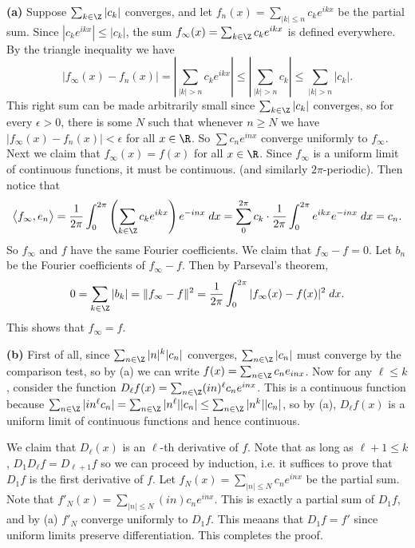 \documentclass[11pt,letterpaper]{article}
\begin{document}
\begin{solution}
    \textbf{(a)} Suppose $\sum_{k\in \Z}|c_k|$ converges, and let $f_n(x)=\sum_{|k|\leq n}c_ke^{ikx}$ be the partial sum. Since $|c_ke^{ikx}|\leq |c_k|$, the sum $f_\infty(x)=\sum_{k\in \Z}c_ke^{ikx}$ is defined everywhere. By the triangle inequality we have
    \[
        |f_\infty(x)-f_n(x)|=\left|\sum_{|k|>n}c_ke^{ikx}\right|\leq \left|\sum_{|k|>n}c_k\right|\leq \sum_{|k|>n}|c_k|
    .\] 
    This right sum can be made arbitrarily small since $\sum_{k\in \Z}|c_k|$ converges, so for every $\epsilon>0$, there is some $N$ such that whenever $n\geq N$ we have $|f_\infty(x)-f_n(x)|<\epsilon$ for all $x\in \R$. So $\sum c_ne^{inx}$ converge uniformly to $f_\infty$. Next we claim that $f_\infty(x)=f(x)$ for all $x\in \R$. Since $f_\infty$ is a uniform limit of continuous functions, it must be continuous. (and similarly $2\pi$-periodic). Then notice that
    \[
        \big\langle f_\infty, e_n \big\rangle = \frac{1}{2\pi} \int^{2\pi}_0 \left(\sum_{k\in \Z} c_k e^{ikx}\right)e^{-inx}\;dx = \sum^{2\pi}_0 c_k \cdot \frac{1}{2\pi}\int^{2\pi}_0 e^{ikx}e^{-inx}\;dx = c_n
    .\] 
    So $f_\infty$ and $f$ have the same Fourier coefficients. We claim that $f_\infty - f=0$. Let $b_n$ be the Fourier coefficients of $f_\infty -f$. Then by Parseval's theorem,
    \[
        0 = \sum_{k\in \Z}|b_k| = \|f_\infty - f\|^2 = \frac{1}{2\pi}\int^{2\pi}_0 |f_\infty(x)-f(x)|^2\;dx
    .\] 
    This shows that $f_\infty=f$. 
    
    \textbf{(b)} First of all, since $\sum_{n\in\Z}|n|^k|c_n|$ converges, $\sum_{n\in \Z}|c_n|$ must converge by the comparison test, so by (a) we can write $f(x)=\sum_{n\in \Z}c_ne_{inx}$. Now for any $\ell \leq k$, consider the function $D_\ell f(x)=\sum_{n\in \Z}(in)^\ell c_ne^{inx}$. This is a continuous function because $\sum_{n\in \Z}|in^\ell c_n|=\sum_{n\in\Z}|n^\ell||c_n|\leq \sum_{n\in \Z}|n^k||c_n|$, so by (a), $D_\ell f(x)$ is a uniform limit of continuous functions and hence continuous. 
    
    We claim that $D_{\ell}(x)$ is an $\ell$-th derivative of $f$. Note that as long as $\ell+1\leq k$, $D_1D_\ell f=D_{\ell+1}f$ so we can proceed by induction, i.e. it suffices to prove that $D_1 f$ is the first derivative of $f$. Let $f_N(x)=\sum_{|n|\leq N}c_n e^{inx}$ be the partial sum. Note that $f'_N(x)=\sum_{|n|\leq N}(in)c_ne^{inx}$. This is exactly a partial sum of $D_1 f$, and by (a) $f'_N$ converge uniformly to $D_1 f$. This meaans that $D_1 f = f'$ since uniform limits preserve differentiation. This completes the proof.  
    

\end{solution}
\end{document}
